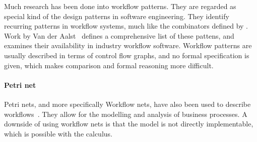 Much research has been done into workflow patterns. They are regarded as special
kind of the design patterns in software engineering. They identify recurring patterns
in workflow systems, much like the combinators defined by \TOPHAT. Work by
Van der Aalst~\cite{journals/dpd/AalstHKB03} defines a comprehensive list of
these pattens, and examines their availability in industry workflow software.
Workflow patterns are usually described in terms of control flow graphs, and no
formal specification is given, which makes comparison and formal reasoning more
difficult.

\paragraph{Petri net}

Petri nets, and more specifically Workflow nets, have also been used to describe
workflows~\cite{journals/jcsc/Aalst98}. They allow for the modelling and
analysis of business processes. A downside of using workflow nets is that the
model is not directly implementable, which is possible with the \TOPHAT calculus.
